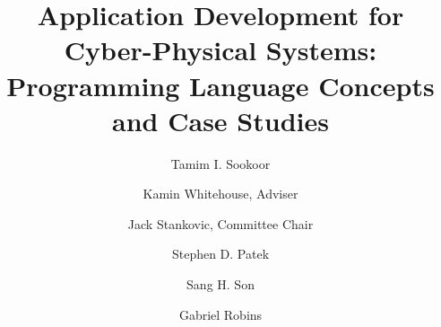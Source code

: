 \documentclass[10pt, letterpaper, openany, final, oneside]{book}
\author{Tamim I. Sookoor}
\title{Application Development for Cyber-Physical Systems: Programming Language Concepts and Case Studies}
\begin{document}
\maketitle
\copyrightpage

\frontmatter



\begin{signatures}
 \signature[Kamin Whitehouse]{Kamin Whitehouse, Adviser}
 \signature[Jack Stankovic]{Jack Stankovic, Committee Chair}
 \signature[Stephen D. Patek]{Stephen D. Patek}
 \signature[Sang H. Son]{Sang H. Son}
 \signature[Gabriel Robins]{Gabriel Robins}

\end{signatures}





\tableofcontents
\listoftables
\listoffigures

\mainmatter



%





%
%
%
%
%
%
%





%
%
%
%
%
%

\backmatter







\end{document}
